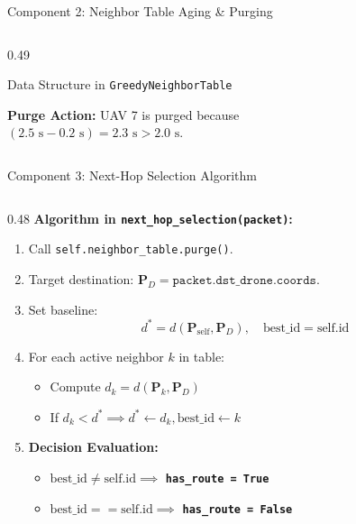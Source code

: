 \documentclass[aspectratio=169,10pt]{beamer}
\begin{document}
\begin{frame}{Component 2: Neighbor Table Aging \& Purging}
\begin{columns}[T]
\begin{column}{0.49\textwidth}
\begin{block}{Data Structure in \texttt{GreedyNeighborTable}}
        \vspace{0.6em}
        \raggedright
        \alert{\textbf{Purge Action:}} UAV 7 is purged because \\
        $(2.5\text{ s} - 0.2\text{ s}) = 2.3\text{ s} > 2.0\text{ s}$.
      \end{block}
    \end{column}
  \end{columns}
\end{frame}

\begin{frame}[fragile]{Component 3: Next-Hop Selection Algorithm}
  \begin{columns}[T]
    \begin{column}{0.48\textwidth}
      \textbf{Algorithm in \texttt{next\_hop\_selection(packet)}:}
      \begin{enumerate}\setlength{\itemsep}{0.25em}
        \item Call \texttt{self.neighbor\_table.purge()}.
        \item Target destination: $\mathbf{P}_D = \texttt{packet.dst\_drone.coords}$.
        \item Set baseline:
          \begin{equation*}
            d^* = d(\mathbf{P}_{\text{self}}, \mathbf{P}_D), \quad \text{best\_id} = \text{self.id}
          \end{equation*}
        \item For each active neighbor $k$ in table:
          \begin{itemize}\setlength{\itemsep}{0.1em}
            \item Compute $d_k = d(\mathbf{P}_k, \mathbf{P}_D)$
            \item If $d_k < d^* \implies d^* \leftarrow d_k, \text{best\_id} \leftarrow k$
          \end{itemize}
        \item \textbf{Decision Evaluation:}
          \begin{itemize}\setlength{\itemsep}{0.1em}
            \item $\text{best\_id} \neq \text{self.id} \implies$ \textbf{\texttt{has\_route = True}}
            \item $\text{best\_id} == \text{self.id} \implies$ \alert{\textbf{\texttt{has\_route = False}}}
          \end{itemize}
      \end{enumerate}
    \end{column}


\end{columns}
\end{frame}
\end{document}
